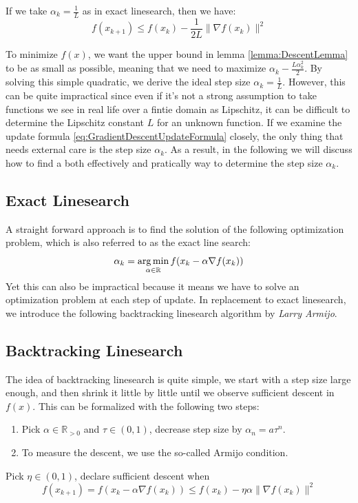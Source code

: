 \begin{corollary}
    If we take $\alpha_k = \frac{1}{L}$ as in exact linesearch, then we have:
    \begin{equation*}
        f(x_{k+1}) \leq f(x_k) - \frac{1}{2L} \| \nabla f(x_k) \|^2
    \end{equation*}
\end{corollary}

To minimize $f(x)$, we want the upper bound in lemma \ref{lemma:DescentLemma} to be as small as possible, meaning that we need to maximize $\alpha_k - \frac{L\alpha_k^2}{2}$. By solving this simple quadratic, we derive the ideal step size $\alpha_k = \frac{1}{L}$. However, this can be quite impractical since even if it's not a strong assumption to take functions we see in real life over a fintie domain as Lipschitz, it can be difficult to determine the Lipschitz constant $L$ for an unknown function. If we examine the update formula \ref{eq:GradientDescentUpdateFormula} closely, the only thing that needs external care is the step size $\alpha_k$. As a result, in the following we will discuss how to find a both effectively and pratically way to determine the step size $\alpha_k$.

\subsection{Exact Linesearch}

A straight forward approach is to find the solution of the following optimization problem, which is also referred to as the exact line search:
\begin{equation*}
    \alpha_k = \operatorname*{arg\,min}_{\alpha \in \mathbb{R}}f(x_k - \alpha\nabla f(x_k))
\end{equation*}
Yet this can also be impractical because it means we have to solve an optimization problem at each step of update. In replacement to exact linesearch, we introduce the following backtracking linesearch algorithm by \emph{Larry Armijo}.

\subsection{Backtracking Linesearch}
The idea of backtracking linesearch is quite simple, we start with a step size large enough, and then shrink it little by little until we observe sufficient descent in $f(x)$. This can be formalized with the following two steps:
\begin{enumerate}
    \item Pick $\alpha \in \mathbb{R}_{>0}$ and $\tau \in (0,1)$, decrease step size by $\alpha_n = a\tau^n$.
    \item To measure the descent, we use the so-called Armijo condition.
\end{enumerate}
\begin{definition}\label{def:ArmijoCondition}
    Pick $\eta \in (0,1)$, declare sufficient descent when 
    \begin{equation*}
        f(x_{k+1}) = f(x_k - \alpha\nabla f(x_k)) \leq f(x_k) - \eta\alpha\|\nabla f(x_k)\|^2
    \end{equation*}
\end{definition}

